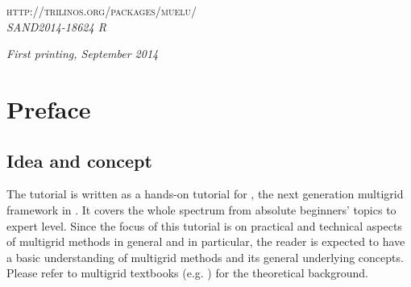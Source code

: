 \documentclass[10pt,fleqn]{book}
\begin{document}
%



\noindent \textsc{http://trilinos.org/packages/muelu/}\\ %

\noindent \textit{SAND2014-18624 R}

\noindent \textit{First printing, September 2014} %


\chapter*{Preface}

\section*{Idea and concept}
The \muelu tutorial is written as a hands-on tutorial for \muelu, the next generation multigrid framework in \trilinos. It covers the whole spectrum from absolute beginners' topics to expert level. Since the focus of this tutorial is on practical and technical aspects of multigrid methods in general and \muelu in particular, the reader is expected to have a basic understanding of multigrid methods and its general underlying concepts. Please refer to multigrid textbooks (e.g. \cite{briggs}) for the theoretical background.
\end{document}

